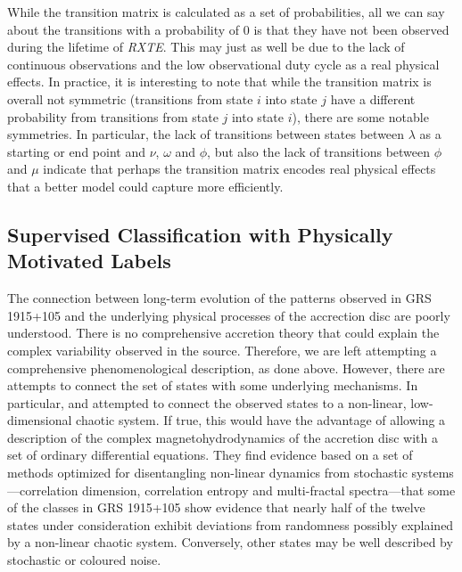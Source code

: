 \documentclass[12pt]{emulateapj}
\newcommand{\project}[1]{\textsl{#1}}
\newcommand{\rxte}{\project{RXTE}}
\begin{document}
While the transition matrix is calculated as a set of probabilities, all we can say about the transitions with a probability of $0$ is that they have not been observed 
during the lifetime of \rxte. This may just as well be due to the lack of continuous observations and the low observational duty cycle as a real physical effects.
In practice, it is interesting to note that while the transition matrix is overall not symmetric (transitions from state $i$ into state $j$ have a different probability from 
transitions from state $j$ into state $i$), there are some notable symmetries. In particular, the lack of transitions between states between $\lambda$ as a starting 
or end point and $\nu$, $\omega$ and $\phi$, but also the lack of transitions between $\phi$ and $\mu$ indicate that perhaps the transition matrix encodes 
real physical effects that a better model could capture more efficiently.

\subsection{Supervised Classification with Physically Motivated Labels}

The connection between long-term evolution of the patterns observed in GRS 1915+105 and the underlying physical processes of the 
accrection disc are poorly understood. There is no comprehensive accretion theory that could explain the complex variability observed in the source. 
Therefore, we are left attempting a comprehensive phenomenological description, as done above.
However, there are attempts to connect the set of 
states with some underlying mechanisms. In particular, \citet{misra2004,misra2006} and \citet{harikrishnan2011} attempted to connect the observed states to 
a non-linear, low-dimensional chaotic system. If true, this would have the advantage of allowing a description of the complex magnetohydrodynamics of the 
accretion disc with a set of ordinary differential equations. They find evidence based on a set of methods optimized for disentangling non-linear dynamics from 
stochastic systems---correlation dimension, correlation entropy and multi-fractal spectra---that some of the classes in GRS 1915+105 show evidence that nearly 
half of the twelve states under consideration exhibit deviations from randomness possibly explained by a non-linear chaotic system. Conversely, other states may 
be well described by stochastic or coloured noise.
\end{document}
